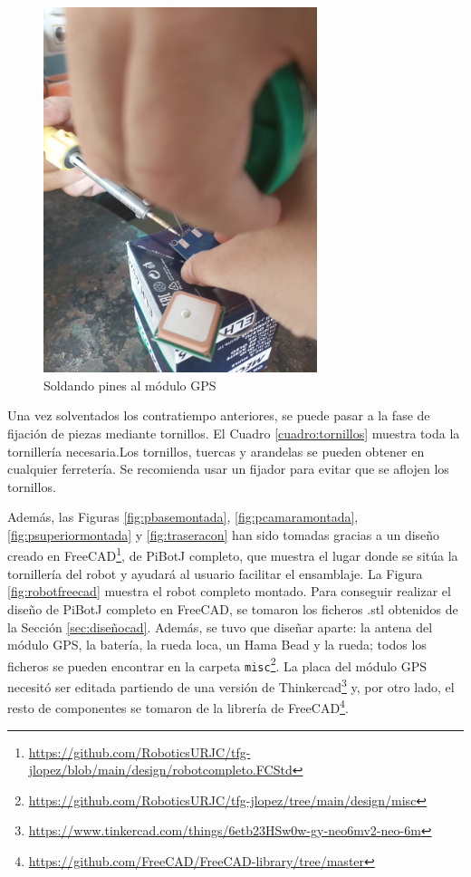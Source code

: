 \begin{figure} [h!]
	\begin{center}
		\includegraphics[width=8cm]{figs/cap5/soldar.jpeg}
	\end{center}
	\caption{Soldando pines al módulo GPS} 
	\label{fig:soldar}
\end{figure}

Una vez solventados los contratiempo anteriores, se puede pasar a la fase de fijación de piezas mediante tornillos. El Cuadro \ref{cuadro:tornillos} muestra toda la tornillería necesaria.Los tornillos, tuercas y arandelas se pueden obtener en cualquier ferretería. Se recomienda usar un fijador para evitar que se aflojen los tornillos.

Además, las Figuras \ref{fig:pbasemontada}, \ref{fig:pcamaramontada}, \ref{fig:psuperiormontada} y \ref{fig:traseracon} han sido tomadas gracias a un diseño creado en FreeCAD\footnote{\url{https://github.com/RoboticsURJC/tfg-jlopez/blob/main/design/robotcompleto.FCStd}}, de PiBotJ completo, que muestra el lugar donde se sitúa la tornillería del robot y ayudará al usuario facilitar el ensamblaje. La Figura \ref{fig:robotfreecad} muestra el robot completo montado. Para conseguir realizar el diseño de PiBotJ completo en FreeCAD, se tomaron los ficheros .stl obtenidos de la Sección \ref{sec:diseñocad}. Además, se tuvo que diseñar aparte: la antena del módulo \acs{GPS}, la batería, la rueda loca, un Hama Bead y la rueda; todos los ficheros se pueden encontrar en la carpeta \verb|misc|\footnote{\url{https://github.com/RoboticsURJC/tfg-jlopez/tree/main/design/misc}}. La placa del módulo \acs{GPS} necesitó ser editada partiendo de una versión de Thinkercad\footnote{\url{https://www.tinkercad.com/things/6etb23HSw0w-gy-neo6mv2-neo-6m}} y, por otro lado, el resto de componentes se tomaron de la librería de FreeCAD\footnote{\url{https://github.com/FreeCAD/FreeCAD-library/tree/master}}.

